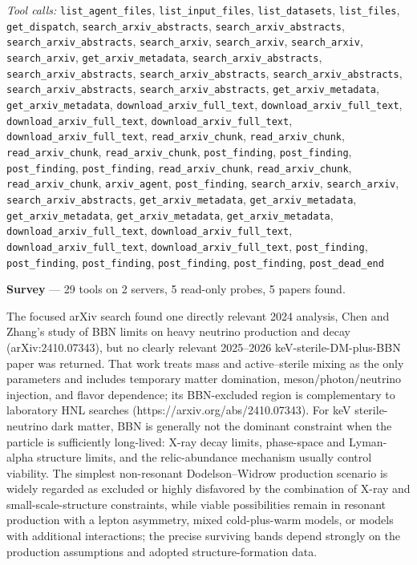 \documentclass[11pt,a4paper]{article}
\begin{document}
\textit{Tool calls:} \texttt{list\_agent\_files}, \texttt{list\_input\_files}, \texttt{list\_datasets}, \texttt{list\_files}, \texttt{get\_dispatch}, \texttt{search\_arxiv\_abstracts}, \texttt{search\_arxiv\_abstracts}, \texttt{search\_arxiv\_abstracts}, \texttt{search\_arxiv}, \texttt{search\_arxiv}, \texttt{search\_arxiv}, \texttt{search\_arxiv}, \texttt{get\_arxiv\_metadata}, \texttt{search\_arxiv\_abstracts}, \texttt{search\_arxiv\_abstracts}, \texttt{search\_arxiv\_abstracts}, \texttt{search\_arxiv\_abstracts}, \texttt{search\_arxiv\_abstracts}, \texttt{search\_arxiv\_abstracts}, \texttt{get\_arxiv\_metadata}, \texttt{get\_arxiv\_metadata}, \texttt{download\_arxiv\_full\_text}, \texttt{download\_arxiv\_full\_text}, \texttt{download\_arxiv\_full\_text}, \texttt{download\_arxiv\_full\_text}, \texttt{download\_arxiv\_full\_text}, \texttt{read\_arxiv\_chunk}, \texttt{read\_arxiv\_chunk}, \texttt{read\_arxiv\_chunk}, \texttt{read\_arxiv\_chunk}, \texttt{post\_finding}, \texttt{post\_finding}, \texttt{post\_finding}, \texttt{post\_finding}, \texttt{read\_arxiv\_chunk}, \texttt{read\_arxiv\_chunk}, \texttt{read\_arxiv\_chunk}, \texttt{arxiv\_agent}, \texttt{post\_finding}, \texttt{search\_arxiv}, \texttt{search\_arxiv}, \texttt{search\_arxiv\_abstracts}, \texttt{get\_arxiv\_metadata}, \texttt{get\_arxiv\_metadata}, \texttt{get\_arxiv\_metadata}, \texttt{get\_arxiv\_metadata}, \texttt{get\_arxiv\_metadata}, \texttt{download\_arxiv\_full\_text}, \texttt{download\_arxiv\_full\_text}, \texttt{download\_arxiv\_full\_text}, \texttt{download\_arxiv\_full\_text}, \texttt{post\_finding}, \texttt{post\_finding}, \texttt{post\_finding}, \texttt{post\_finding}, \texttt{post\_finding}, \texttt{post\_dead\_end}\par
\textbf{Survey} --- 29 tools on 2 servers, 5 read-only probes, 5 papers found.

The focused arXiv search found one directly relevant 2024 analysis, Chen and Zhang's study of BBN limits on heavy neutrino production and decay (arXiv:2410.07343), but no clearly relevant 2025--2026 keV-sterile-DM-plus-BBN paper was returned. That work treats mass and active--sterile mixing as the only parameters and includes temporary matter domination, meson/photon/neutrino injection, and flavor dependence; its BBN-excluded region is complementary to laboratory HNL searches (https://arxiv.org/abs/2410.07343). For keV sterile-neutrino dark matter, BBN is generally not the dominant constraint when the particle is sufficiently long-lived: X-ray decay limits, phase-space and Lyman-alpha structure limits, and the relic-abundance mechanism usually control viability. The simplest non-resonant Dodelson--Widrow production scenario is widely regarded as excluded or highly disfavored by the combination of X-ray and small-scale-structure constraints, while viable possibilities remain in resonant production with a lepton asymmetry, mixed cold-plus-warm models, or models with additional interactions; the precise surviving bands depend strongly on the production assumptions and adopted structure-formation data.
\end{document}
